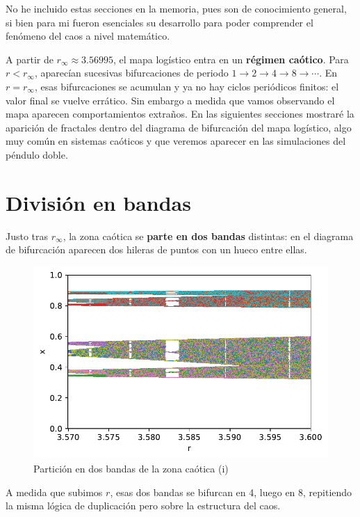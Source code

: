 \documentclass[
  10pt,
  a4paper,
  DIV=11,
  numbers=noendperiod,
  open=any]{scrreprt}
\numberwithin{equation}{chapter}
\numberwithin{equation}{section}
\renewcommand{\[}{\begin{equation}}
\renewcommand{\]}{\end{equation}}
\begin{document}
No he incluido estas secciones en la memoria, pues son de conocimiento general, si bien para mi fueron esenciales su desarrollo para poder comprender el fenómeno del caos a nivel matemático. 


A partir de \(r_\infty \approx 3.56995\), el mapa logístico entra en un
\textbf{régimen caótico}. Para \(r < r_\infty\), aparecían sucesivas
bifurcaciones de periodo \(1 \to 2 \to 4 \to 8 \to \cdots\). En
\(r = r_\infty\), esas bifurcaciones se acumulan y ya no hay ciclos
periódicos finitos: el valor final se vuelve errático. Sin embargo a
medida que vamos observando el mapa aparecen comportamientos extraños. En las siguientes secciones mostraré la aparición de fractales dentro del diagrama de bifurcación del mapa logístico, algo muy común en sistemas caóticos y que veremos aparecer en las simulaciones del péndulo doble. 

\section{División en bandas}\label{divisiuxf3n-en-bandas}

Justo tras \(r_\infty\), la zona caótica se \textbf{parte en dos bandas}
distintas: en el diagrama de bifurcación aparecen dos hileras de puntos
con un hueco entre ellas.

\begin{figure}[h]
  \centering
  \includegraphics[keepaspectratio]{01-logistica/Caos_files/figure-pdf/cell-2-output-1.pdf}
  \caption{Partición en dos bandas de la zona caótica (i)}
\end{figure}    

A medida que subimos \(r\), esas dos bandas se bifurcan en 4, luego en
8, repitiendo la misma lógica de duplicación pero sobre la estructura
del caos.
\end{document}
